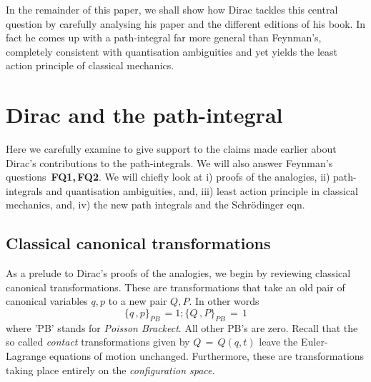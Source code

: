 \documentclass[a4paper]{JHEP3}
\newcommand{\be}{\begin{equation}}
\newcommand{\ee}{\end{equation}}
\begin{document}
In the remainder of this paper, we shall show how Dirac tackles this central question by carefully analysing his paper and the different editions of his book. In fact he comes up with a path-integral far more general than Feynman's, completely consistent with quantisation ambiguities and yet
yields the least action principle of classical mechanics. 


\section{Dirac and the path-integral}
Here we carefully examine \cite{diracpaper, diracbook2, diracbook4r} to give support to the claims made earlier about Dirac's contributions
to the path-integrals. We will also answer Feynman's questions {\bf\,FQ1,\,FQ2}. We will chiefly look at i) proofs of the analogies, ii) 
path-integrals and quantisation ambiguities, and, iii) least action principle in classical mechanics, and, iv) the new path integrals and the
Schr\"odinger eqn. 
\subsection{Classical canonical transformations}
As a prelude to Dirac's proofs of
the analogies, we begin by reviewing classical canonical transformations.  
These are transformations that take an old pair of canonical variables $q,p$ to a new pair $Q,P$. In other words
\be
\label{eq:canonicaltr}
\{q\,,p\}_{PB}\,= 1; \{Q\,,P\}_{PB}\,=\,1
\ee
where 'PB' stands for {\it Poisson Brackect}. All other PB's are zero. Recall that the so called {\it contact} transformations given by
$Q\,=\,Q(q,t)$ leave the Euler-Lagrange equations of motion unchanged. Furthermore, these are transformations taking place entirely on
the {\it configuration space}. 
\end{document}
